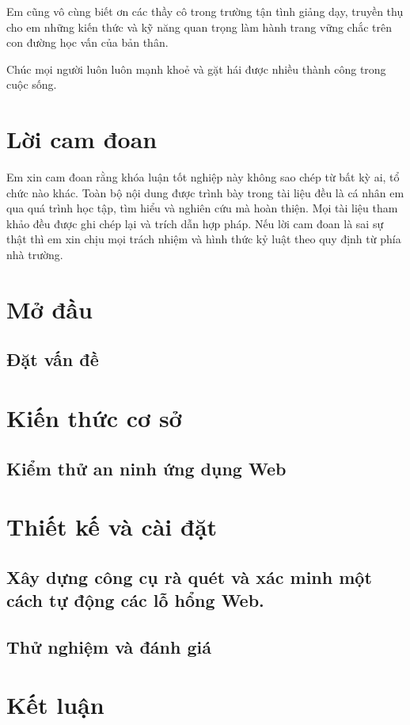 \documentclass[12pt,a4paper]{report}
\begin{document}
Em cũng vô cùng biết ơn các thầy cô trong trường tận tình giảng dạy, truyền thụ cho
em những kiến thức và kỹ năng quan trọng làm hành trang vững chắc trên con đường học vấn
của bản thân.

Chúc mọi người luôn luôn mạnh khoẻ và gặt hái được nhiều thành công trong cuộc sống.

\chapter*{Lời cam đoan}

Em xin cam đoan rằng khóa luận tốt nghiệp này không sao chép từ bất kỳ ai,
tổ chức nào khác. Toàn bộ nội dung được trình bày trong tài liệu đều là cá nhân em qua quá
trình học tập, tìm hiểu và nghiên cứu mà hoàn thiện. Mọi tài liệu tham khảo đều được ghi chép
lại và trích dẫn hợp pháp. Nếu lời cam đoan là sai sự thật thì em xin chịu mọi trách nhiệm và
hình thức kỷ luật theo quy định từ phía nhà trường.

\tableofcontents{}
\clearpage{}

\listoffigures{}

\listoftables{}

\chapter{Mở đầu}

\section{Đặt vấn đề}


\chapter{Kiến thức cơ sở}

\section{Kiểm thử an ninh ứng dụng Web}


\chapter{Thiết kế và cài đặt}
\section{Xây dựng công cụ rà quét và xác minh một cách tự động các lỗ hổng Web.}


\section{Thử nghiệm và đánh giá}


\chapter{Kết luận}



\nocite{*}
\printbibliography[heading=bibintoc, title=Tài liệu tham khảo]

\end{document}
